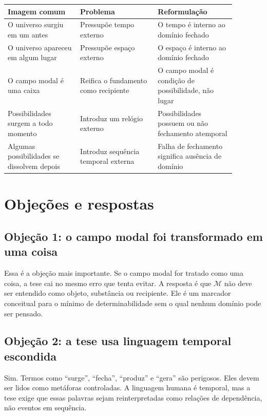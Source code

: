 \documentclass[11pt,a4paper]{article}
\newcommand{\CMP}{\mathcal{M}}
\begin{document}
\begin{center}
\begin{tabular}{>{\raggedright\arraybackslash}p{0.28\linewidth} >{\raggedright\arraybackslash}p{0.30\linewidth} >{\raggedright\arraybackslash}p{0.30\linewidth}}
\toprule
\textbf{Imagem comum} & \textbf{Problema} & \textbf{Reformulação}\\
\midrule
O universo surgiu em um antes & Pressupõe tempo externo & O tempo é interno ao domínio fechado \\
\addlinespace
O universo apareceu em algum lugar & Pressupõe espaço externo & O espaço é interno ao domínio fechado \\
\addlinespace
O campo modal é uma caixa & Reifica o fundamento como recipiente & O campo modal é condição de possibilidade, não lugar \\
\addlinespace
Possibilidades surgem a todo momento & Introduz um relógio externo & Possibilidades possuem ou não fechamento atemporal \\
\addlinespace
Algumas possibilidades se dissolvem depois & Introduz sequência temporal externa & Falha de fechamento significa ausência de domínio \\
\bottomrule
\end{tabular}
\end{center}

\section{Objeções e respostas}

\subsection{Objeção 1: o campo modal foi transformado em uma coisa}

Essa é a objeção mais importante. Se o campo modal for tratado como uma coisa, a tese cai no mesmo erro que tenta evitar. A resposta é que \(\CMP\) não deve ser entendido como objeto, substância ou recipiente. Ele é um marcador conceitual para o mínimo de determinabilidade sem o qual nenhum domínio pode ser pensado.

\subsection{Objeção 2: a tese usa linguagem temporal escondida}

Sim. Termos como ``surge'', ``fecha'', ``produz'' e ``gera'' são perigosos. Eles devem ser lidos como metáforas controladas. A linguagem humana é temporal, mas a tese exige que essas palavras sejam reinterpretadas como relações de dependência, não eventos em sequência.
\end{document}
